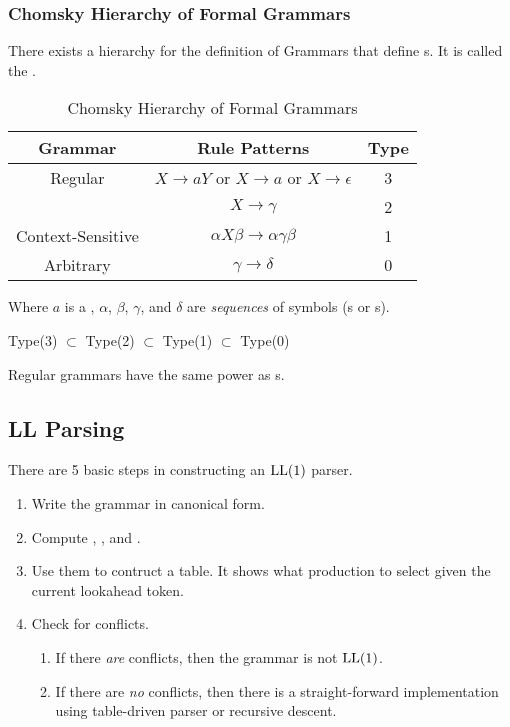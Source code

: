 \subsubsection{Chomsky Hierarchy of Formal Grammars}\label{subsubsec:Formal_Grammar_Hierarchy}
There exists a hierarchy for the definition of Grammars that define s.
It is called the \emph{}.
\begin{table}[h!]
  \centering
  \begin{tabular}{ccc}
    \toprule
    Grammar & Rule Patterns & Type \\
    \midrule
    Regular & $X \rightarrow a Y$ or $X \rightarrow a$ or $X \rightarrow \epsilon$ & 3 \\
    \nameref{def:Context_Free_Grammar} & $X \rightarrow \gamma$ & 2 \\
    Context-Sensitive & $\alpha X \beta \rightarrow \alpha \gamma \beta$ & 1 \\
    Arbitrary & $\gamma \rightarrow \delta$ & 0 \\
    \bottomrule
  \end{tabular}
  \caption{Chomsky Hierarchy of Formal Grammars}
  \label{tab:Formal_Grammar_Hierarchy}
\end{table}

Where $a$ is a , $\alpha$, $\beta$, $\gamma$, and $\delta$ are \emph{sequences} of symbols (s or s).

Type(3) $\subset$ Type(2) $\subset$ Type(1) $\subset$ Type(0)

Regular grammars have the same power as s.

\subsection{LL Parsing}\label{subsec:LLParsing}
There are 5 basic steps in constructing an $\operatorname{\text{LL}}(1)$ parser.
\begin{enumerate}[noitemsep]
\item Write the grammar in canonical form.
\item Compute , , and .
\item Use them to contruct a table. It shows what production to select given the current lookahead token.
\item Check for conflicts.
  \begin{enumerate}[noitemsep]
  \item If there \emph{are} conflicts, then the grammar is not $\operatorname{\text{LL}}(1)$.
  \item If there are \emph{no} conflicts, then there is a straight-forward implementation using table-driven parser or recursive descent.
  \end{enumerate}
\end{enumerate}

